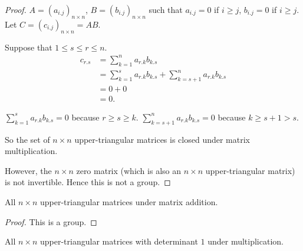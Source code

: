 \begin{proof}
    $A = {(a_{i.j})}_{n\times n}$, $B = {(b_{i.j})}_{n\times n}$ such that $a_{i.j} = 0$ if $i\geq j$, $b_{i.j} = 0$ if $i\geq j$. Let $C = {(c_{i.j})}_{n\times n} = AB$.

    Suppose that $1\le s\le r\le n$.
    \begin{align*}
        c_{r.s} & = \sum^{n}_{k=1}a_{r.k}b_{k.s}                                  \\
                & = \sum^{s}_{k=1}a_{r.k}b_{k.s} + \sum^{n}_{k=s+1}a_{r.k}b_{k.s} \\
                & = 0 + 0                                                         \\
                & = 0.
    \end{align*}

    $\displaystyle\sum^{s}_{k=1}a_{r.k}b_{k.s} = 0$ because $r\ge s\ge k$. $\displaystyle\sum^{n}_{k=s+1}a_{r.k}b_{k.s} = 0$ because $k \geq s + 1 > s$.

    So the set of $n\times n$ upper-triangular matrices is closed under matrix multiplication.

    However, the $n\times n$ zero matrix (which is also an $n\times n$ upper-triangular matrix) is not invertible. Hence this is not a group.
\end{proof}

\begin{exercise}
    All $n\times n$ upper-triangular matrices under matrix addition.
\end{exercise}

\begin{proof}
    This is a group.
\end{proof}

\begin{exercise}
    All $n\times n$ upper-triangular matrices with determinant $1$ under multiplication.
\end{exercise}


